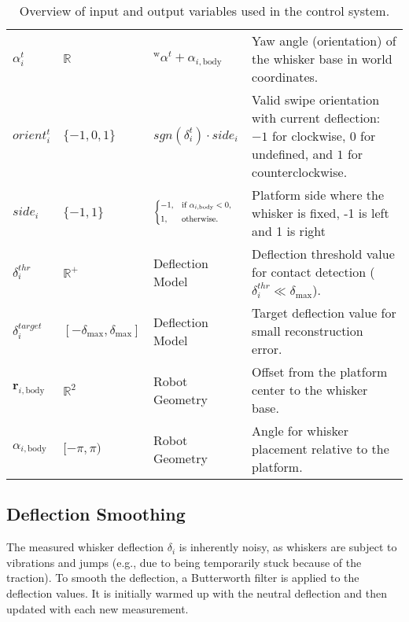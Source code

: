 \begin{table}[htb]
\begin{tabular}{p{1cm} p{2cm} p{3cm} p{8cm}}
        \(\alpha_{i}^{t}\)                    & \(\mathbb{R}\)                                     & \(^{\mathrm{w}}\alpha^{t} + \alpha_{i, \textrm{body}}\) & Yaw angle (orientation) of the whisker base in world coordinates.                                                           \\
        \(orient_{i}^{t}\)                    & \(\{-1, 0, 1\}\)                                   & \(sgn(\delta_{i}^{t}) \cdot side_{i}\)                  & Valid swipe orientation with current deflection: \(-1\) for clockwise, \(0\) for undefined, and \(1\) for counterclockwise. \\
        \(side_{i}\)                          & \(\{-1, 1\}\)                                      & \(\branch{\alpha_{i,\mathrm{body}} < 0}{-1}{1}\)        & Platform side where the whisker is fixed, -1 is left and 1 is right                                                         \\
        \(\delta_{i}^{thr}\)                  & \(\mathbb{R}^{+}\)                                 & Deflection Model                                        & Deflection threshold value for contact detection (\(\delta_{i}^{thr}\ll\delta_{\textrm{max}}\)).                            \\
        \(\delta_{i}^{target}\)               & \([-\delta_{\textrm{max}},\delta_{\textrm{max}}]\) & Deflection Model                                        & Target deflection value for small reconstruction error.                                                                     \\
        \(\boldsymbol{r}_{i, \textrm{body}}\) & \(\mathbb{R}^2\)                                   & Robot Geometry                                          & Offset from the platform center to the whisker base.                                                                        \\
        \(\alpha_{i, \textrm{body}}\)         & \([-\pi,\pi)\)                                     & Robot Geometry                                          & Angle for whisker placement relative to the platform.                                                                       \\
        \bottomrule
    \end{tabular}
    \caption{Overview of input and output variables used in the control system.}
    \label{tab:variables}
\end{table}

\subsection{Deflection Smoothing}
The measured whisker deflection \(\delta_{i}\) is inherently noisy, as whiskers are subject to vibrations and jumps (e.g., due to being temporarily stuck because of the traction).
To smooth the deflection, a Butterworth filter is applied to the deflection values.
It is initially warmed up with the neutral deflection and then updated with each new measurement.


